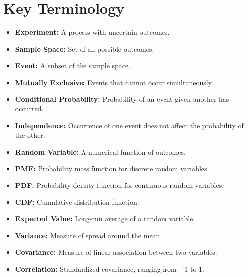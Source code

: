 \documentclass[11pt]{article}
\begin{document}
\section*{Key Terminology}
\begin{itemize}[nosep]
    \item \textbf{Experiment:} A process with uncertain outcomes.
    \item \textbf{Sample Space:} Set of all possible outcomes.
    \item \textbf{Event:} A subset of the sample space.
    \item \textbf{Mutually Exclusive:} Events that cannot occur simultaneously.
    \item \textbf{Conditional Probability:} Probability of an event given another has occurred.
    \item \textbf{Independence:} Occurrence of one event does not affect the probability of the other.
    \item \textbf{Random Variable:} A numerical function of outcomes.
    \item \textbf{PMF:} Probability mass function for discrete random variables.
    \item \textbf{PDF:} Probability density function for continuous random variables.
    \item \textbf{CDF:} Cumulative distribution function.
    \item \textbf{Expected Value:} Long-run average of a random variable.
    \item \textbf{Variance:} Measure of spread around the mean.
    \item \textbf{Covariance:} Measure of linear association between two variables.
    \item \textbf{Correlation:} Standardized covariance, ranging from \(-1\) to \(1\).
\end{itemize}

\end{document}
